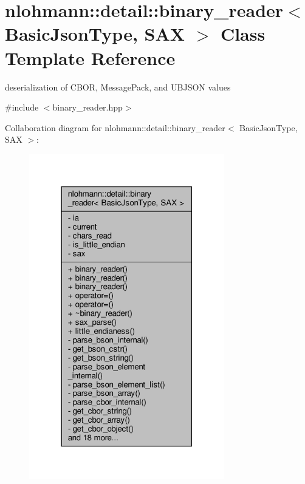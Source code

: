 \hypertarget{classnlohmann_1_1detail_1_1binary__reader}{}\section{nlohmann\+:\+:detail\+:\+:binary\+\_\+reader$<$ Basic\+Json\+Type, S\+AX $>$ Class Template Reference}
\label{classnlohmann_1_1detail_1_1binary__reader}


deserialization of C\+B\+OR, Message\+Pack, and U\+B\+J\+S\+ON values  




{\ttfamily \#include $<$binary\+\_\+reader.\+hpp$>$}



Collaboration diagram for nlohmann\+:\+:detail\+:\+:binary\+\_\+reader$<$ Basic\+Json\+Type, S\+AX $>$\+:
\nopagebreak
\begin{figure}[H]
\begin{center}
\leavevmode
\includegraphics[width=241pt]{classnlohmann_1_1detail_1_1binary__reader__coll__graph}
\end{center}
\end{figure}
